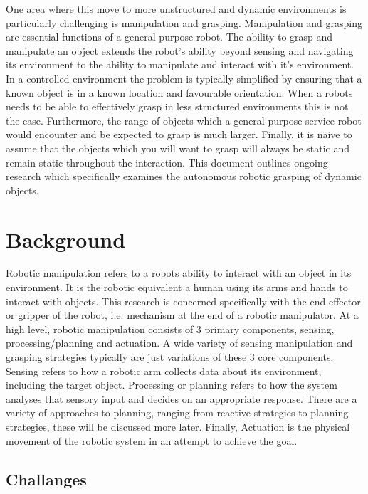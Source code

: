One area where this move to more unstructured and dynamic environments is particularly challenging is manipulation and grasping. Manipulation and grasping are essential functions of a general purpose robot. The ability to grasp and manipulate an object extends the robot's ability beyond sensing and navigating its environment to the ability to manipulate and interact with it's environment. In a controlled environment the problem is typically simplified by ensuring that a known object is in a known location and favourable orientation. When a robots needs to be able to effectively grasp in less structured environments this is not the case. Furthermore, the range of objects which a general purpose service robot would encounter and be expected to grasp is much larger. Finally, it is naive to assume that the objects which you will want to grasp will always be static and remain static throughout the interaction. This document outlines ongoing research which specifically examines the autonomous robotic grasping of dynamic objects.

\section{Background}
Robotic manipulation refers to a robots ability to interact with an object in its environment. It is the robotic equivalent a human using its arms and hands to interact with objects. This research is concerned  specifically with the end effector or gripper of the robot, i.e. mechanism at the end of a robotic manipulator. At a high level, robotic manipulation consists of 3 primary components, sensing, processing/planning and actuation. A wide variety of sensing manipulation and grasping strategies typically are just variations of these 3 core components. Sensing refers to how a robotic arm collects data about its environment, including the target object. Processing or planning refers to how the system analyses that sensory input and decides on an appropriate response. There are a variety of approaches to planning, ranging from reactive strategies to planning strategies, these will be discussed more later. Finally, Actuation is the physical movement of the robotic system in an attempt to achieve the goal.


\subsection{Challanges}

